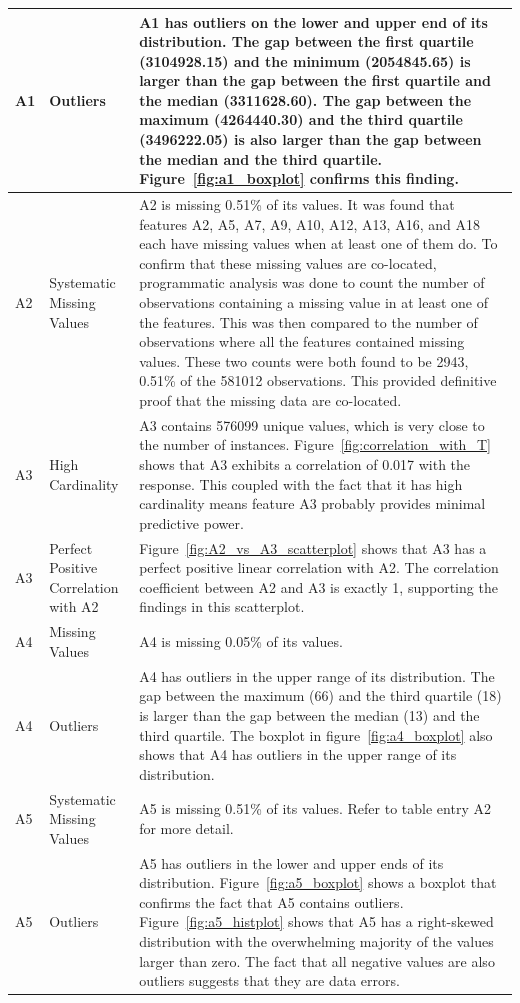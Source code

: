 \documentclass[11pt]{report}
\begin{document}
\begin{longtable}{lp{4cm}p{7cm}}
A1 & Outliers & A1 has outliers on the lower and upper end of its distribution. The gap between the first quartile (3104928.15) and the minimum (2054845.65) is larger than the gap between the first quartile and the median (3311628.60). The gap between the maximum (4264440.30) and the third quartile (3496222.05) is also larger than the gap between the median and the third quartile. Figure~\ref{fig:a1_boxplot} confirms this finding.\\ 
\midrule
A2 & Systematic Missing Values &  A2 is missing 0.51\% of its values. It was found that features A2, A5, A7, A9, A10, A12, A13, A16, and A18 each have missing values when at least one of them do. To confirm that these missing values are co-located, programmatic analysis was done to count the number of observations containing a missing value in at least one of the features. This was then compared to the number of observations where all the features contained missing values. These two counts were both found to be 2943, 0.51\% of the 581012 observations. This provided definitive proof that the missing data are co-located. \\
\midrule
A3 & High Cardinality &  A3 contains 576099 unique values, which is very close to the number of instances. Figure~\ref{fig:correlation_with_T} shows that A3 exhibits a correlation of 0.017 with the response. This coupled with the fact that it has high cardinality means feature A3 probably provides minimal predictive power.  \\
\midrule
A3 & Perfect Positive Correlation with A2 & Figure~\ref{fig:A2_vs_A3_scatterplot} shows that A3 has a perfect positive linear correlation with A2. The correlation coefficient between A2 and A3 is exactly 1, supporting the findings in this scatterplot. \\
\midrule
A4 & Missing Values &  A4 is missing 0.05\% of its values. \\
\midrule
A4 & Outliers &  A4 has outliers in the upper range of its distribution. The gap between the maximum (66) and the third quartile (18) is larger than the gap between the median (13) and the third quartile. The boxplot in figure~\ref{fig:a4_boxplot} also shows that A4 has outliers in the upper range of its distribution. \\
\midrule
A5 & Systematic Missing Values &  A5 is missing 0.51\% of its values. Refer to table entry A2 for more detail. \\
\midrule
A5 & Outliers & A5 has outliers in the lower and upper ends of its distribution. Figure~\ref{fig:a5_boxplot} shows a boxplot that confirms the fact that A5 contains outliers. Figure~\ref{fig:a5_histplot} shows that A5 has a right-skewed distribution with the overwhelming majority of the values larger than zero. The fact that all negative values are also outliers suggests that they are data errors. \\

\end{longtable}
\end{document}
